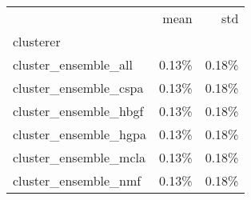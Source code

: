 \begin{tabular}{lrr}
\toprule
{} &  mean &   std \\
clusterer             &       &       \\
\midrule
cluster\_ensemble\_all  & 0.13\% & 0.18\% \\
cluster\_ensemble\_cspa & 0.13\% & 0.18\% \\
cluster\_ensemble\_hbgf & 0.13\% & 0.18\% \\
cluster\_ensemble\_hgpa & 0.13\% & 0.18\% \\
cluster\_ensemble\_mcla & 0.13\% & 0.18\% \\
cluster\_ensemble\_nmf  & 0.13\% & 0.18\% \\
\bottomrule
\end{tabular}

